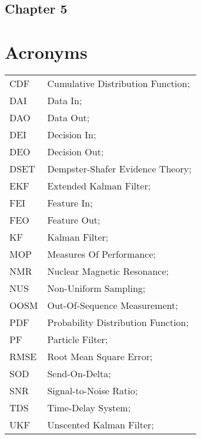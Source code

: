 \subsection*{Chapter 5}

\newpage
\section*{Acronyms}
\begin{tabular}{ll}
	CDF			& Cumulative Distribution Function; \\
	DAI			& Data In; \\
	DAO			& Data Out; \\
	DEI			& Decision In; \\
	DEO 		& Decision Out; \\
	DSET 		& Dempster-Shafer Evidence Theory; \\		
	EKF			& Extended Kalman Filter; \\
	FEI			& Feature In; \\
	FEO			& Feature Out; \\
	KF 			& Kalman Filter; \\
	MOP 		& Measures Of Performance; \\
	NMR 		& Nuclear Magnetic Resonance; \\
	NUS 		& Non-Uniform Sampling; \\ 
	OOSM 		& Out-Of-Sequence Measurement; \\
	PDF         & Probability Distribution Function; \\
	PF 			& Particle Filter; \\
	RMSE		& Root Mean Square Error; \\
	SOD			& Send-On-Delta; \\
	SNR			& Signal-to-Noise Ratio; \\
	TDS			& Time-Delay System; \\
	UKF			& Unscented Kalman Filter; \\
\end{tabular}

